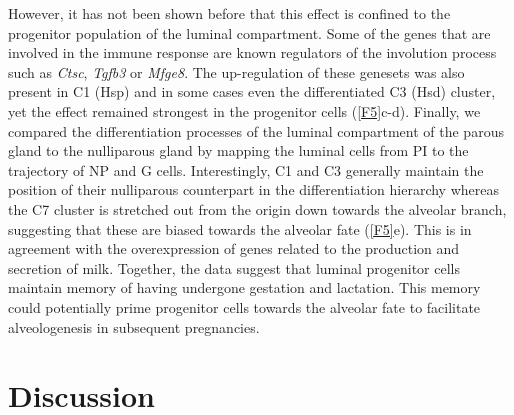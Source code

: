 \documentclass[titlepage, 12pt, oneside]{amsart}
\begin{document}
However, it has not been shown before that this effect is confined to the progenitor population of the luminal compartment.
Some of the genes that are involved in the immune response are known regulators of the involution process such as \textit{Ctsc}, \textit{Tgfb3} or \textit{Mfge8}\autocite{Clarkson2003}.
The up-regulation of these genesets was also present in C1 (Hsp) and in some cases even the differentiated C3 (Hsd) cluster, yet the effect remained strongest in the progenitor cells (\autoref{F5}c-d).
Finally, we compared the differentiation processes of the luminal compartment of the parous gland to the nulliparous gland by mapping the luminal cells from PI to the trajectory of NP and G cells.
Interestingly, C1 and C3 generally maintain the position of their nulliparous counterpart in the differentiation hierarchy whereas the C7 cluster is stretched out from the origin down towards the alveolar branch, suggesting that these are biased towards the alveolar fate (\autoref{F5}e).
This is in agreement with the overexpression of genes related to the production and secretion of milk.
Together, the data suggest that luminal progenitor cells maintain memory of having undergone gestation and lactation.
This memory could potentially prime progenitor cells towards the alveolar fate to facilitate alveologenesis in subsequent pregnancies.

\section{Discussion}
\end{document}
